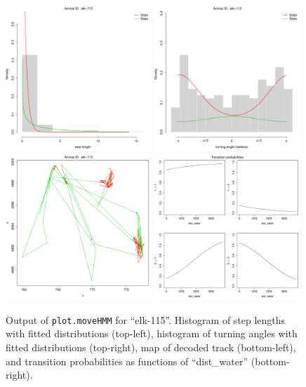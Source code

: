 \documentclass[]{article}
\begin{document}
\begin{figure}[h]
	\includegraphics[width=0.49\textwidth]{pictures/hist_step_elk1}
	\includegraphics[width=0.49\textwidth]{pictures/hist_angle_elk1} \\
 	\includegraphics[width=0.49\textwidth]{pictures/map_elk1}
	\includegraphics[width=0.49\textwidth]{pictures/tpm_elk1}
	\caption{Output of \texttt{plot.moveHMM} for ``elk-115''. Histogram of step lengths with fitted distributions (top-left), histogram of turning angles with fitted distributions (top-right), map of decoded track (bottom-left), and transition probabilities as functions of ``dist\_water'' (bottom-right).}
	\label{moveHMM}
\end{figure}
\end{document}

